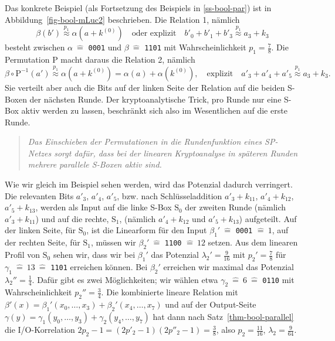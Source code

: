 \begin{refsegment}
Das konkrete Beispiel (als Fortsetzung des Beispiels in \ref{ss-bool-par})
ist in Abbildung~\ref{fig-bool-mLuc2} beschrieben.
Die Relation {\color{red} 1}, nämlich
\[
     \beta(b') \stackrel{p_1}{\approx} \alpha(a + k^{(0)}) \quad \text{oder explizit} \quad
     b'_0 + b'_1 + b'_3 \stackrel{p_1}{\approx} a_3 + k_3
\]
besteht zwischen $\alpha \:\hat{=}$ \verb:0001: und
$\beta \:\hat{=}$ \verb:1101: mit Wahrscheinlichkeit $p_1 = \frac{7}{8}$. Die
Permutation $\textrm{P}$ macht daraus die Relation {\color{red} 2}, nämlich
\[
     \beta \circ \textrm{P}^{-1}(a') \stackrel{p_1}{\approx}
        \alpha(a + k^{(0)}) = \alpha(a) + \alpha(k^{(0)}), \quad
     \text{explizit} \quad a'_3 + a'_4 + a'_5 \stackrel{p_1}{\approx} a_3 + k_3.
\]
Sie verteilt aber auch die Bits auf der linken Seite der Relation
auf die beiden S-Boxen der nächsten Runde. Der kryptoanalytische Trick,
pro Runde nur eine S-Box aktiv werden zu lassen, beschränkt sich also
im Wesentlichen auf die erste Runde.
\begin{quote}
   {\em Das Einschieben der Permutationen in die
   Rundenfunktion eines SP-Netzes sorgt dafür, dass
   bei der linearen Kryptoanalyse in späteren Runden mehrere parallele
   S-Boxen aktiv sind.}
\end{quote}
Wie wir gleich im Beispiel sehen werden, wird das Potenzial dadurch
verringert. Die relevanten Bits $a'_3$, $a'_4$, $a'_5$, bzw. nach
Schlüsseladdition $a'_3 + k_{11}$, $a'_4 + k_{12}$, $a'_5 + k_{13}$,
werden als Input auf die linke S-Box $\textrm{S}_0$ der
zweiten Runde (nämlich $a'_3 + k_{11}$) und auf die rechte,
$\textrm{S}_1$, (nämlich $a'_4 + k_{12}$ und $a'_5 + k_{13}$) aufgeteilt.
Auf der linken Seite, für $\textrm{S}_0$, ist die Linearform für
den Input $\beta_1' \:\hat{=}$ \verb:0001: $\hat{=}\: 1$, auf der rechten Seite, für
$\textrm{S}_1$, müssen wir $\beta_2' \:\hat{=}$ {\tt 1100} $\hat{=}\: 12$ setzen.
Aus dem linearen Profil von $\textrm{S}_0$ sehen wir,
dass wir bei $\beta_1'$ das Potenzial $\lambda_2' = \frac{9}{16}$
mit $p_2' = \frac{7}{8}$ für $\gamma_1 \:\hat{=}\: 13 \:\hat{=}$
\verb:1101: erreichen können. Bei $\beta_2'$ erreichen wir maximal das
Potenzial $\lambda_2'' = \frac{1}{4}$. Dafür gibt es zwei Möglichkeiten;
wir wählen etwa $\gamma_2 \:\hat{=}\: 6 \:\hat{=}$ \verb:0110:
mit Wahrscheinlichkeit $p_2'' = \frac{3}{4}$.
Die kombinierte lineare Relation mit
$\beta'(x) = \beta_1'(x_0,\ldots, x_3) + \beta_2'(x_4,\ldots, x_7)$
und auf der Output-Seite
$\gamma(y) = \gamma_1(y_0,\ldots, y_3) + \gamma_2(y_4,\ldots, y_7)$
hat dann nach Satz~\ref{thm-bool-parallel} die I/O-Korrelation
$2 p_2 - 1 = (2 p'_2 - 1)(2 p''_2 - 1) = \frac{3}{8}$,
also $p_2 = \frac{11}{16}$, $\lambda_2 = \frac{9}{64}$.


\end{refsegment}

